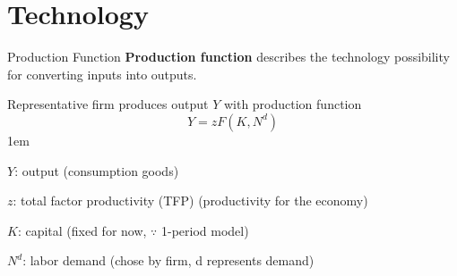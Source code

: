 \documentclass[11pt,aspectratio=43]{beamer} \usepackage[utf8]{inputenc}
\let\olditemize=\itemize
\let\endolditemize=\enditemize
\renewenvironment{itemize}{\olditemize \itemsep1em}{\endolditemize}
\theoremstyle{definition}
\begin{document}
\section{Technology}
\label{sec:Technology}

\begin{frame}{Production Function}
\label{slide:Production_Function}
    \textbf{Production function} describes the technology possibility for \alert{converting inputs into outputs}.

    Representative firm produces output $ Y $ with production function
    \begin{equation}
    \label{eq:production}
         Y = z F( K, N^{d} )
    \end{equation}
    \begin{itemize}
        \item $ Y $: output (consumption goods)
        \item $ z $: \alert{total factor productivity (TFP)} (productivity for the economy)
        \item $ K $: capital (fixed for now, $ \because $ 1-period model)
        \item $ N^{d} $: labor demand (chose by firm, \alert{d} represents demand)
    \end{itemize}
\end{frame}
\end{document}
